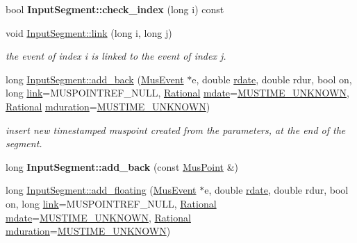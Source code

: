 \begin{DoxyCompactItemize}
bool {\bfseries Input\+Segment\+::check\+\_\+index} (long i) const
\item 
void \mbox{\hyperlink{group__segment_ga43310a16681e2241b20da4b68de9f35b}{Input\+Segment\+::link}} (long i, long j)
\begin{DoxyCompactList}\small\item\em the event of index i is linked to the event of index j. \end{DoxyCompactList}\item 
long \mbox{\hyperlink{group__segment_gabb6224ab371e84d2048f3c9e2692d15d}{Input\+Segment\+::add\+\_\+back}} (\mbox{\hyperlink{classMusEvent}{Mus\+Event}} $\ast$e, double \mbox{\hyperlink{group__segment_ga7c26187b3e70ea62bd10b9b15284a99a}{rdate}}, double rdur, bool on, long \mbox{\hyperlink{group__segment_ga43310a16681e2241b20da4b68de9f35b}{link}}=M\+U\+S\+P\+O\+I\+N\+T\+R\+E\+F\+\_\+\+N\+U\+LL, \mbox{\hyperlink{classRational}{Rational}} \mbox{\hyperlink{group__segment_ga6fce03f54fe517cc9541ea446cd26a50}{mdate}}=\mbox{\hyperlink{group__general_gae862a9d955eb3154601efb64980ac24b}{M\+U\+S\+T\+I\+M\+E\+\_\+\+U\+N\+K\+N\+O\+WN}}, \mbox{\hyperlink{classRational}{Rational}} \mbox{\hyperlink{classInputSegment_aa5410aeef3d5c6a263424b252eb78511}{mduration}}=\mbox{\hyperlink{group__general_gae862a9d955eb3154601efb64980ac24b}{M\+U\+S\+T\+I\+M\+E\+\_\+\+U\+N\+K\+N\+O\+WN}})
\begin{DoxyCompactList}\small\item\em insert new timestamped muspoint created from the parameters, at the end of the segment. \end{DoxyCompactList}\item 
\mbox{\label{group__segment_ga2c58dc6e5e032dc7fee299be296371e4}} 
long {\bfseries Input\+Segment\+::add\+\_\+back} (const \mbox{\hyperlink{classMusPoint}{Mus\+Point}} \&)
\item 
long \mbox{\hyperlink{group__segment_gad44eb7379e181fc4295ee2514a568204}{Input\+Segment\+::add\+\_\+floating}} (\mbox{\hyperlink{classMusEvent}{Mus\+Event}} $\ast$e, double \mbox{\hyperlink{group__segment_ga7c26187b3e70ea62bd10b9b15284a99a}{rdate}}, double rdur, bool on, long \mbox{\hyperlink{group__segment_ga43310a16681e2241b20da4b68de9f35b}{link}}=M\+U\+S\+P\+O\+I\+N\+T\+R\+E\+F\+\_\+\+N\+U\+LL, \mbox{\hyperlink{classRational}{Rational}} \mbox{\hyperlink{group__segment_ga6fce03f54fe517cc9541ea446cd26a50}{mdate}}=\mbox{\hyperlink{group__general_gae862a9d955eb3154601efb64980ac24b}{M\+U\+S\+T\+I\+M\+E\+\_\+\+U\+N\+K\+N\+O\+WN}}, \mbox{\hyperlink{classRational}{Rational}} \mbox{\hyperlink{classInputSegment_aa5410aeef3d5c6a263424b252eb78511}{mduration}}=\mbox{\hyperlink{group__general_gae862a9d955eb3154601efb64980ac24b}{M\+U\+S\+T\+I\+M\+E\+\_\+\+U\+N\+K\+N\+O\+WN}})

\end{DoxyCompactItemize}
